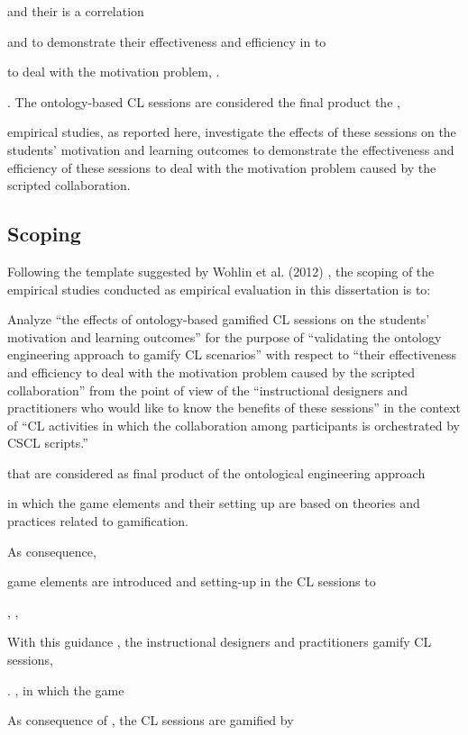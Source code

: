 and their is a correlation 

 and  to demonstrate their effectiveness and efficiency in to 




 to deal with the motivation problem, .

. The ontology-based CL sessions are considered the final product the , 

 empirical studies, as reported here, investigate the effects of these sessions on the students’ motivation and learning outcomes to demonstrate the effectiveness and efficiency of these sessions to deal with the motivation problem caused by the scripted collaboration.

\subsection{Scoping}

Following the template suggested by Wohlin et al. (2012) , the scoping of the empirical studies conducted as empirical evaluation in this dissertation  is to:

Analyze “the effects of ontology-based gamified CL sessions on the students’ motivation and learning outcomes” for the purpose of “validating the ontology engineering approach to gamify CL scenarios” with respect to “their effectiveness and efficiency to deal with the motivation problem caused by the scripted collaboration” from the point of view of the “instructional designers and practitioners who would like to know the benefits of these sessions” in the context of “CL activities in which the collaboration among participants is orchestrated by CSCL scripts.”



that are considered as final product of the ontological engineering approach 

 in which the game elements and their setting up are based on theories and practices related to gamification. 


As consequence, 


game elements are introduced and setting-up in the CL sessions to 

, , 

With this guidance , the instructional designers and practitioners gamify CL sessions, 

. , in which the game 




  As consequence of , the CL sessions are gamified by 

